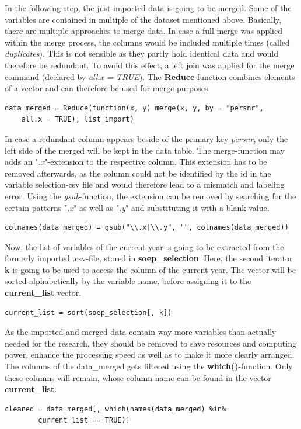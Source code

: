 \documentclass[a4paper]{article}
\begin{document}
In the following step, the just imported data is going to be merged.
Some of the variables are contained in multiple of the dataset mentioned above. Basically, there are multiple approaches to merge data. In case a full merge was applied within the merge process, the columns would be included multiple times (called \textit{duplicates}). This is not sensible as they partly hold identical data and would therefore be redundant. To avoid this effect, a left join was applied for the merge command (declared by \textit{all.x = TRUE}). The \textbf{Reduce}-function combines elements of a vector and can therefore be used for merge purposes.
\begin{lstlisting}[firstnumber=36]
    data_merged = Reduce(function(x, y) merge(x, y, by = "persnr", 
    all.x = TRUE), list_import)
\end{lstlisting}

In case a redundant column appears beside of the primary key \textit{persnr}, only the left side of the merged will be kept in the data table. The merge-function may adds an "\textit{.x}"-extension to the respective column. This extension has to be removed afterwards, as the column could not be identified by the id in the variable selection-csv file and would therefore lead to a mismatch and labeling error. Using the \textit{gsub}-function, the extension can be removed by searching for the certain patterns "\textit{.x}" as well as "\textit{.y}" and substituting it with a blank value.
\begin{lstlisting}[firstnumber=38]
    colnames(data_merged) = gsub("\\.x|\\.y", "", colnames(data_merged))
\end{lstlisting}

Now, the list of variables of the current year is going to be extracted from the formerly imported .csv-file, stored in \textbf{soep\_selection}. Here, the second iterator \textbf{k} is going to be used to access the column of the current year. The vector will be sorted alphabetically by the variable name, before assigning it to the \textbf{current\_list} vector.
\begin{lstlisting}[firstnumber=40]
    current_list = sort(soep_selection[, k])
\end{lstlisting}

As the imported and merged data contain way more variables than actually needed for the research, they should be removed to save resources and computing power, enhance the processing speed as well as to make it more clearly arranged. The columns of the data\_merged gets filtered using the \textbf{which()}-function. Only these columns will remain, whose column name can be found in the vector \textbf{current\_list}.
\begin{lstlisting}[firstnumber=42]
    cleaned = data_merged[, which(names(data_merged) %in% 
    	current_list == TRUE)]
\end{lstlisting}
\end{document}
